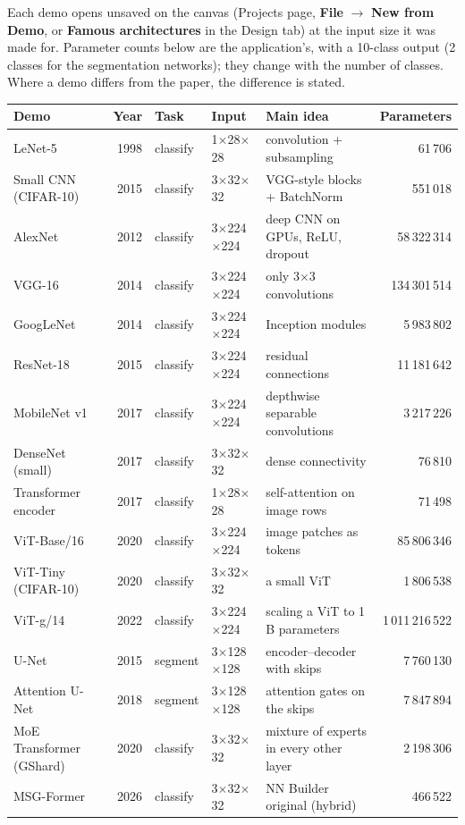 \documentclass[11pt,a4paper]{article}
\newcommand{\ui}[1]{\textbf{\textsf{#1}}}
\begin{document}
Each demo opens unsaved on the canvas (Projects page, \ui{File} $\rightarrow$ \ui{New from Demo}, or \ui{Famous architectures} in the
Design tab) at the input size it was made for. Parameter counts below are the application's, with a 10-class output (2 classes for the
segmentation networks); they change with the number of classes. Where a demo differs from the paper, the difference is stated.

{\small
\begin{longtable}{@{}p{3.3cm}rlp{2.2cm}p{4.3cm}r@{}}
\toprule
\textbf{Demo} & \textbf{Year} & \textbf{Task} & \textbf{Input} & \textbf{Main idea} & \textbf{Parameters}\\
\midrule\endhead
LeNet-5 & 1998 & classify & 1$\times$28$\times$28 & convolution + subsampling & 61\,706\\
Small CNN (CIFAR-10) & 2015 & classify & 3$\times$32$\times$32 & VGG-style blocks + BatchNorm & 551\,018\\
AlexNet & 2012 & classify & 3$\times$224$\times$224 & deep CNN on GPUs, ReLU, dropout & 58\,322\,314\\
VGG-16 & 2014 & classify & 3$\times$224$\times$224 & only 3$\times$3 convolutions & 134\,301\,514\\
GoogLeNet & 2014 & classify & 3$\times$224$\times$224 & Inception modules & 5\,983\,802\\
ResNet-18 & 2015 & classify & 3$\times$224$\times$224 & residual connections & 11\,181\,642\\
MobileNet v1 & 2017 & classify & 3$\times$224$\times$224 & depthwise separable convolutions & 3\,217\,226\\
DenseNet (small) & 2017 & classify & 3$\times$32$\times$32 & dense connectivity & 76\,810\\
Transformer encoder & 2017 & classify & 1$\times$28$\times$28 & self-attention on image rows & 71\,498\\
ViT-Base/16 & 2020 & classify & 3$\times$224$\times$224 & image patches as tokens & 85\,806\,346\\
ViT-Tiny (CIFAR-10) & 2020 & classify & 3$\times$32$\times$32 & a small ViT & 1\,806\,538\\
ViT-g/14 & 2022 & classify & 3$\times$224$\times$224 & scaling a ViT to 1 B parameters & 1\,011\,216\,522\\
U-Net & 2015 & segment & 3$\times$128$\times$128 & encoder--decoder with skips & 7\,760\,130\\
Attention U-Net & 2018 & segment & 3$\times$128$\times$128 & attention gates on the skips & 7\,847\,894\\
MoE Transformer (GShard) & 2020 & classify & 3$\times$32$\times$32 & mixture of experts in every other layer & 2\,198\,306\\
MSG-Former & 2026 & classify & 3$\times$32$\times$32 & NN Builder original (hybrid) & 466\,522\\
\bottomrule
\end{longtable}}
\end{document}
